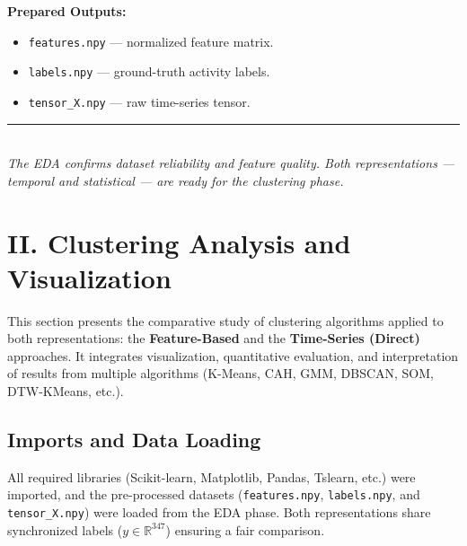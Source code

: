 \documentclass[12pt,a4paper]{report}
\begin{document}
\textbf{Prepared Outputs:}
\begin{itemize}[label=--, leftmargin=1.2cm, itemsep=2pt]
    \item \texttt{features.npy} — normalized feature matrix.
    \item \texttt{labels.npy} — ground-truth activity labels.
    \item \texttt{tensor\_X.npy} — raw time-series tensor.
\end{itemize}


\vspace{0.5cm}
\begin{center}
\rule{0.75\textwidth}{0.4pt}\\
\textit{The EDA confirms dataset reliability and feature quality.
Both representations — temporal and statistical — are ready for the clustering phase.}
\end{center}

















\chapter{II. Clustering Analysis and Visualization}

This section presents the comparative study of clustering algorithms applied to both representations:
the \textbf{Feature-Based} and the \textbf{Time-Series (Direct)} approaches.
It integrates visualization, quantitative evaluation, and interpretation of results from multiple algorithms
(K-Means, CAH, GMM, DBSCAN, SOM, DTW-KMeans, etc.).

\section{Imports and Data Loading}
All required libraries (Scikit-learn, Matplotlib, Pandas, Tslearn, etc.) were imported, and the pre-processed datasets
(\texttt{features.npy}, \texttt{labels.npy}, and \texttt{tensor\_X.npy}) were loaded from the EDA phase.
Both representations share synchronized labels (\( y \in \mathbb{R}^{347} \)) ensuring a fair comparison.
\end{document}
